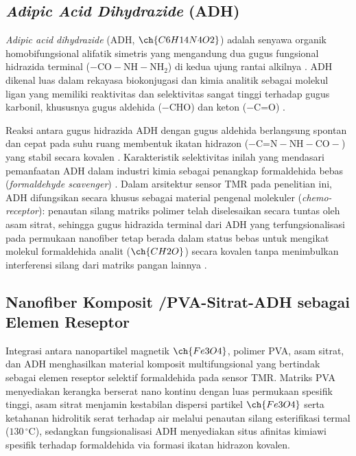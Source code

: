 \subsection{\textit{Adipic Acid Dihydrazide} (ADH)}
\textit{Adipic acid dihydrazide} (ADH, $\ch{C6H14N4O2}$) adalah senyawa organik homobifungsional alifatik simetris yang mengandung dua gugus fungsional hidrazida terminal ($- \text{CO}-\text{NH}-\text{NH}_2$) di kedua ujung rantai alkilnya \cite{sigma_adh}. ADH dikenal luas dalam rekayasa biokonjugasi dan kimia analitik sebagai molekul ligan yang memiliki reaktivitas dan selektivitas sangat tinggi terhadap gugus karbonil, khususnya gugus aldehida ($- \text{CHO}$) dan keton ($- \text{C=O}$) \cite{sigma_adh}.

Reaksi antara gugus hidrazida ADH dengan gugus aldehida berlangsung spontan dan cepat pada suhu ruang membentuk ikatan hidrazon ($- \text{C=N}-\text{NH}-\text{CO}-$) yang stabil secara kovalen \cite{sigma_adh}. Karakteristik selektivitas inilah yang mendasari pemanfaatan ADH dalam industri kimia sebagai penangkap formaldehida bebas (\textit{formaldehyde scavenger}) \cite{gantrade_adh}. Dalam arsitektur sensor TMR pada penelitian ini, ADH difungsikan secara khusus sebagai material pengenal molekuler (\textit{chemo-receptor}): penautan silang matriks polimer telah diselesaikan secara tuntas oleh asam sitrat, sehingga gugus hidrazida terminal dari ADH yang terfungsionalisasi pada permukaan nanofiber tetap berada dalam status bebas untuk mengikat molekul formaldehida analit ($\ch{CH2O}$) secara kovalen tanpa menimbulkan interferensi silang dari matriks pangan lainnya \cite{gantrade_adh}.

\subsection{Nanofiber Komposit /PVA-Sitrat-ADH sebagai Elemen Reseptor}
\label{subsec:fe3o4pvaadh}
Integrasi antara nanopartikel magnetik $\ch{Fe3O4}$, polimer PVA, asam sitrat, dan ADH menghasilkan material komposit multifungsional yang bertindak sebagai elemen reseptor selektif formaldehida pada sensor TMR. Matriks PVA menyediakan kerangka berserat nano kontinu dengan luas permukaan spesifik tinggi, asam sitrat menjamin kestabilan dispersi partikel $\ch{Fe3O4}$ serta ketahanan hidrolitik serat terhadap air melalui penautan silang esterifikasi termal ($130\,^{\circ}\text{C}$), sedangkan fungsionalisasi ADH menyediakan situs afinitas kimiawi spesifik terhadap formaldehida via formasi ikatan hidrazon kovalen.

